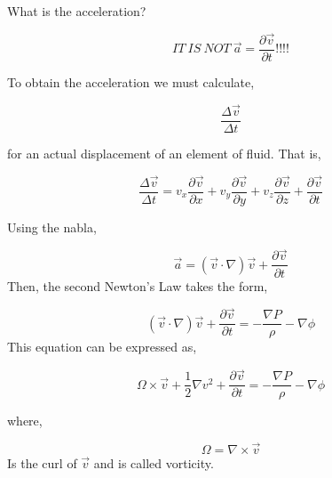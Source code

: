 \documentclass[]{beamer}
\begin{document}
\begin{frame}

What is the acceleration?
\vspace{3mm}
\pause



\begin{equation*}
IT~IS~NOT~\vec{a}=\frac{\partial \vec{v}}{\partial t}!!!!
\end{equation*}
\vspace{3mm}

\pause
To obtain the acceleration we must calculate,
\vspace{3mm}

\begin{equation*}
\frac{\Delta \vec{v}}{\Delta t}
\end{equation*}


for an actual displacement of an element of fluid. That is,


\begin{equation*}
\frac{\Delta \vec{v}}{\Delta t}=v_x \frac{\partial \vec{v}}{\partial x}+v_y \frac{\partial \vec{v}}{\partial y}+v_z \frac{\partial \vec{v}}{\partial z}+\frac{\partial \vec{v}}{\partial t}
\end{equation*}



 \end{frame}





\begin{frame}

Using the nabla,


\begin{equation*}
\vec{a}=(\vec{v}\cdot \nabla)\vec{v}+\frac{\partial \vec{v}}{\partial t}
\end{equation*}
\pause
Then, the second Newton's Law takes the form,

 \begin{equation*}
(\vec{v}\cdot \nabla)\vec{v}+\frac{\partial \vec{v}}{\partial t}=-\frac{\nabla P}{\rho}- \nabla \phi 
\end{equation*}
\pause
This equation can be expressed as,

 \begin{equation*}
\Omega\times\vec{v}+\frac{1}{2}\nabla v^2+\frac{\partial \vec{v}}{\partial t}=-\frac{\nabla P}{\rho}- \nabla \phi 
\end{equation*}

\pause
where,


 \begin{equation*}
\Omega=\nabla\times\vec{v}
\end{equation*}
\pause
Is the curl of $\vec{v}$ and is called vorticity.


 \end{frame}
\end{document}
